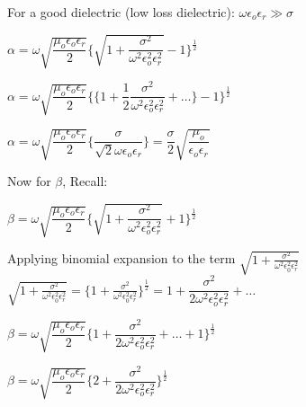 For a good dielectric (low loss dielectric): $\omega\epsilon_{o}\epsilon_{r} \gg \sigma$

\begin{center}
$\alpha = \omega\sqrt{\dfrac{\mu_{o}\epsilon_{o}\epsilon_{r}}{2}}\Bigg\{{\sqrt{1 + \dfrac{\sigma^{2}}{\omega^{2}\epsilon_{o}^{2}\epsilon_{r}^{2}}}} - 1\Bigg\}^{\frac{1}{2}}$
\end{center}

\begin{center}
$\alpha = \omega\sqrt{\dfrac{\mu_{o}\epsilon_{o}\epsilon_{r}}{2}}\Bigg\{\bigg\{1 + \dfrac{1}{2} \dfrac{\sigma^{2}}{\omega^{2}\epsilon_{o}^{2}\epsilon_{r}^{2}} + \dots\bigg\} - 1\Bigg\}^{\frac{1}{2}}$
\end{center}

\begin{center}
$\alpha = \omega\sqrt{\dfrac{\mu_{o}\epsilon_{o}\epsilon_{r}}{2}}\Bigg\{\dfrac{\sigma}{\sqrt{2}\omega\epsilon_{o}\epsilon_{r}}\Bigg\} =\dfrac{\sigma}{2}\sqrt{\dfrac{\mu_{o}}{\epsilon_{o}\epsilon_{r}}}$
\end{center}

Now for $\beta$, Recall:
\begin{center}
$\beta = \omega\sqrt{\dfrac{\mu_{o}\epsilon_{o}\epsilon_{r}}{2}}\Bigg\{{\sqrt{1 + \dfrac{\sigma^{2}}{\omega^{2}\epsilon_{o}^{2}\epsilon_{r}^{2}}}} + 1\Bigg\}^{\frac{1}{2}}$
\end{center}

Applying binomial expansion to the term $\sqrt{1 + \frac{\sigma^2}{\omega^2\epsilon_{0}^2\epsilon_{r}^2}}$\\

$\sqrt{1 + \frac{\sigma^2}{\omega^2\epsilon_{0}^2\epsilon_{r}^2}} = \bigg\{1 +\frac{\sigma^2}{\omega^2\epsilon_{0}^2\epsilon_{r}^2}\bigg\}^{\frac{1}{2}} = 1 + \dfrac{\sigma^{2}}{2\omega^{2}\epsilon_{o}^{2}\epsilon_{r}^{2}} + \dots$\\

\begin{center}
$\beta = \omega\sqrt{\dfrac{\mu_{o}\epsilon_{o}\epsilon_{r}}{2}}\Bigg\{1 + \dfrac{\sigma^{2}}{2\omega^{2}\epsilon_{o}^{2}\epsilon_{r}^{2}} + \dots + 1\Bigg\}^{\frac{1}{2}}$
\end{center}

\begin{center}
$\beta = \omega\sqrt{\dfrac{\mu_{o}\epsilon_{o}\epsilon_{r}}{2}}\Bigg\{2 + \dfrac{\sigma^{2}}{2\omega^{2}\epsilon_{o}^{2}\epsilon_{r}^{2}}\Bigg\}^{\frac{1}{2}}$
\end{center}

